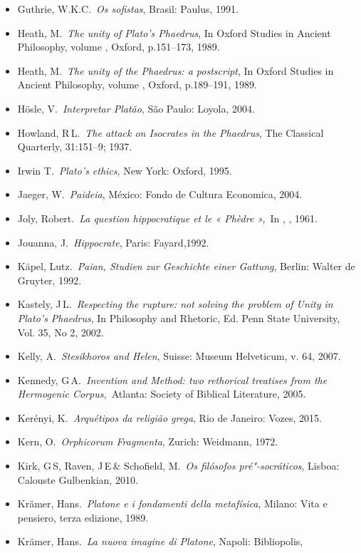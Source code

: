 \begin{itemize}
\item
  Guthrie, W.K.C.~\emph{Os sofistas}, Brasil: Paulus, 1991.
\item
  Heath, M.~\emph{The unity of Plato's Phaedrus}, In Oxford Studies in
  Ancient Philosophy, volume , Oxford, p.151--173, 1989.
\item
  Heath, M.~\emph{The unity of the Phaedrus: a postscript}, In Oxford
  Studies in Ancient Philosophy, volume , Oxford, p.189--191, 1989.
\item
  Hösle, V.~\emph{Interpretar Platão}, São Paulo: Loyola, 2004.
\item
  Howland, R\,L.~\emph{The attack on Isocrates in the Phaedrus}, The
  Classical Quarterly, 31:151--9; 1937.
\item
  Irwin T.~\emph{Plato's ethics}, New York: Oxford, 1995.
\item
  Jaeger, W.~\emph{Paideia}, México: Fondo de Cultura Economica, 2004.
\item
  Joly, Robert.~\emph{La question hippocratique et le « Phèdre »,}~In
  , , 1961.
\item
  Jouanna, J.~\emph{Hippocrate}, Paris: Fayard,1992.
\item
  Käpel, Lutz.~\emph{Paian, Studien zur Geschichte einer Gattung},
  Berlin: Walter de Gruyter, 1992.
\item
  Kastely, J\,L.~\emph{Respecting the rupture: not solving the problem
  of Unity in Plato's Phaedrus}, In Philosophy and Rhetoric, Ed. Penn
  State University, Vol. 35, No 2, 2002.
\item
  Kelly, A.~\emph{Stesikhoros and Helen}, Suisse: Museum Helveticum, v.
  64, 2007.
\item
  Kennedy, G\,A.~\emph{Invention and Method: two rethorical treatises
  from the Hermogenic Corpus,}~Atlanta: Society of Biblical Literature,
  2005.
\item
  Kerényi, K.~\emph{Arquétipos da religião grega}, Rio de Janeiro:
  Vozes, 2015.
\item
  Kern, O.~\emph{Orphicorum Fragmenta}, Zurich: Weidmann, 1972.
\item
  Kirk, G\,S, Raven, J\,E\,\& Schofield, M.~\emph{Os filósofos
  pré"-socráticos}, Lisboa: Calouste Gulbenkian, 2010.
\item
  Krämer, Hans.~\emph{Platone e i fondamenti della metafísica}, Milano:
  Vita e pensiero, terza edizione, 1989.
\item
  Krämer, Hans.~\emph{La nuova imagine di Platone}, Napoli: Bibliopolis,

\end{itemize}
